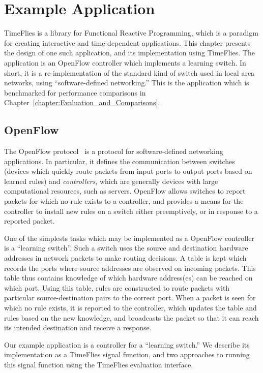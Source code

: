 \chapter{Example Application}
\label{chapter:Example_Application}

TimeFlies is a library for Functional Reactive Programming, which is a paradigm
for creating interactive and time-dependent applications. This chapter presents
the design of one such application, and its implementation using TimeFlies. The
application is an OpenFlow controller which implements a learning switch. In
short, it is a re-implementation of the standard kind of switch used in local
area networks, using ``software-defined networking.'' This
is the application which is benchmarked for performance comparisons in
Chapter~\ref{chapter:Evaluation_and_Comparisons}.

\section{OpenFlow}
\label{section:Example_Application-OpenFlow}

The OpenFlow protocol~\cite{OpenflowSpec} is a protocol for software-defined
networking applications. In particular, it defines the communication between
switches (devices which quickly route packets from input ports to output ports
based on learned rules) and {\em controllers}, which are generally devices with
large computational resources, such as servers. OpenFlow allows switches to
report packets for which no rule exists to a controller, and provides a means
for the controller to install new rules on a switch either preemptively, or in
response to a reported packet.

One of the simplests tasks which may be implemented as a OpenFlow controller is
a ``learning switch''. Such a switch uses the source and destination hardware
addresses in network packets to make routing decisions. A table is kept which
records the ports where source addresses are observed on incoming packets. This
table thus contains knowledge of which hardware address(es) can be reached on
which port. Using this table, rules are constructed to route packets with
particular source-destination pairs to the correct port. When a packet is seen
for which no rule exists, it is reported to the controller, which updates the
table and rules based on the new knowledge, and broadcasts the packet so that
it can reach its intended destination and receive a response.

Our example application is a controller for a ``learning switch.'' We describe
its implementation as a TimeFlies signal function, and two approaches to running
this signal function using the TimeFlies evaluation interface.

